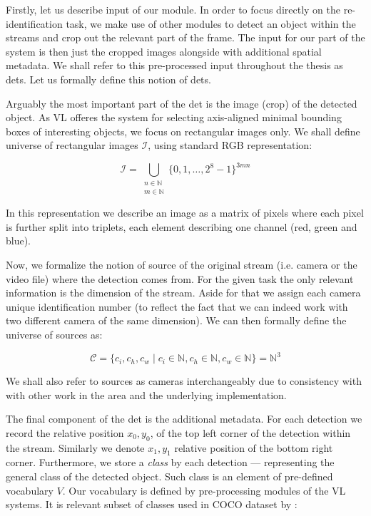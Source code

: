 \label{ssec:input}

Firstly, let us describe input of our module. In order to focus directly on the
re-identification task, we make use of other modules to detect an object within
the streams and crop out the relevant part of the frame. The input for our part
of the system is then just the cropped images alongside with additional spatial
metadata. We shall refer to this pre-processed input throughout the thesis as
\glspl{det}. Let us formally define this notion of \glspl{det}.

Arguably the most important part of the \gls{det} is the image (crop)
of the detected object. As \gls{VL} offeres the system for selecting
axis-aligned minimal bounding boxes of interesting objects, we focus on
rectangular images only. We shall define universe of rectangular images
$\mathcal{I}$, using standard RGB representation:

\begin{equation}
\mathcal{I} = \bigcup_{\substack{n \in \mathbb{N} \\ m \in \mathbb{N}}} \{0, 1, \ldots, 2^8-1\}^{3mn}
\label{eq:image}
\end{equation}


In this representation we describe an image as a matrix of pixels where each
pixel is further split into triplets, each element describing one channel (red,
green and blue).

Now, we formalize the notion of source of the original stream (i.e. camera or
the video file) where the detection comes from. For the given task the only
relevant information is the dimension of the stream. Aside for that we assign
each camera unique identification number (to reflect the fact that we can indeed
work with two different camera of the same dimension). We can then formally
define the universe of sources as:

$$\mathcal{C} = \{c_i, c_h, c_w \mid c_i \in \mathbb{N}, c_h \in \mathbb{N}, c_w \in \mathbb{N}\}
 = \mathbb{N}^3$$
 
We shall also refer to sources as cameras interchangeably due to consistency with
with other work in the area and the underlying implementation.

The final component of the \gls{det} is the additional metadata. For each
detection we record the relative position $x_0, y_0$, of the top left corner of
the detection within the stream. Similarly we denote $x_1, y_1$ relative
position of the bottom right corner. Furthermore, we store a \emph{class} by
each detection --- representing the general class of the detected object. Such
class is an element of pre-defined vocabulary $V$. Our vocabulary is defined
by pre-processing modules of the \gls{VL} systems. It is relevant subset of
classes used in COCO dataset by \cite{cocodataset}:

